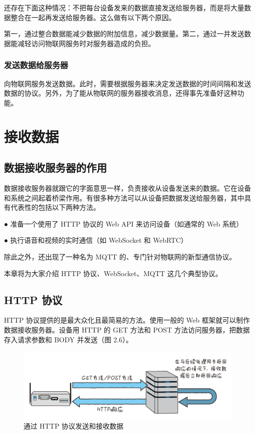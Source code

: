 \documentclass[12pt,UTF8]{ctexbook}
\begin{document}
还存在下面这种情况：不把每台设备发来的数据直接发送给服务器，而是将大量数据整合在一起再发送给服务器。这么做有以下两个原因。

第一，通过整合数据能减少数据的附加信息，减少数据量。第二，通过一并发送数据能减轻访问物联网服务时对服务器造成的负担。

\subsubsection{发送数据给服务器}

向物联网服务发送数据。此时，需要根据服务器来决定发送数据的时间间隔和发送数据的协议。另外，为了能从物联网的服务器接收消息，还得事先准备好这种功能。

\section{接收数据}

\subsection{数据接收服务器的作用}

数据接收服务器就跟它的字面意思一样，负责接收从设备发送来的数据。它在设备和系统之间起着桥梁作用。有很多种方法可以从设备把数据发送给服务器，其中具有代表性的包括以下两种方法。

● 准备一个使用了 HTTP 协议的 Web API 来访问设备（如通常的 Web 系统）

● 执行语音和视频的实时通信（如 WebSocket 和 WebRTC）

除此之外，还出现了一种名为 MQTT 的、专门针对物联网的新型通信协议。

本章将为大家介绍 HTTP 协议、WebSocket、MQTT 这几个典型协议。

\subsection{HTTP 协议}

HTTP 协议提供的是最大众化且最简易的方法。使用一般的 Web 框架就可以制作数据接收服务器。设备用 HTTP 的 GET 方法和 POST 方法访问服务器，把数据存入请求参数和 BODY 并发送（图 2.6）。

\begin{figure}[htbp]
	\centering
	\includegraphics[width=1\linewidth]{25}
	\caption{通过 HTTP 协议发送和接收数据}
	\label{fig:1}
\end{figure}
\end{document}
